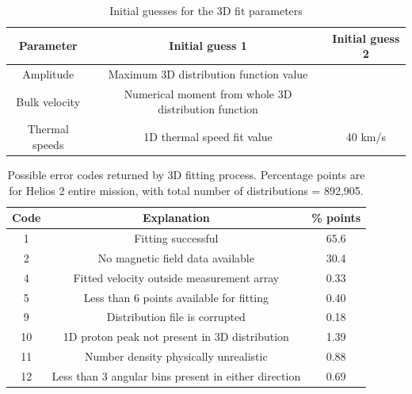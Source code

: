 \documentclass[11pt,a4paper]{article}
\begin{document}
\begin{table}
	\centering
	\begin{tabular}{| c | c | c |}
		\hline
		Parameter 		& Initial guess 1								& Initial guess 2	\\ \hline  \hline
		Amplitude		& Maximum 3D distribution function value			&				\\ \hline
		Bulk velocity	 	& Numerical moment from whole 3D distribution function	& 	\\ \hline
		Thermal speeds 	& 1D thermal speed fit value							& 40 km/s	\\ \hline
	\end{tabular}
	\caption{Initial guesses for the 3D fit parameters}
	\label{tab:3D param guesses}
\end{table}

\begin{table}
	\centering
	\begin{tabular}{| c | c |  c |}
		\hline
		Code &	Explanation 							& \% points	\\ \hline \hline
		1 &		Fitting successful						& 65.6		\\ \hline
		2 &		No magnetic field data available 			& 30.4		\\ \hline
		4 &		Fitted velocity outside measurement array	& 0.33		 \\ \hline
		5 &		Less than 6 points available for fitting		& 0.40		 \\ \hline
		9 &		Distribution file is corrupted 			& 0.18		\\ \hline
		10&		1D proton peak not present in 3D distribution	& 1.39	 \\ \hline
		11&		Number density physically unrealistic 		& 0.88		\\ \hline
		12&		Less than 3 angular bins present in either direction	& 0.69	 \\ \hline
	\end{tabular}
	\caption{Possible error codes returned by 3D fitting process. Percentage points are for Helios 2 entire mission, with total number of distributions = 892,905.}
	\label{tab:3D errors}
\end{table}
\end{document}
